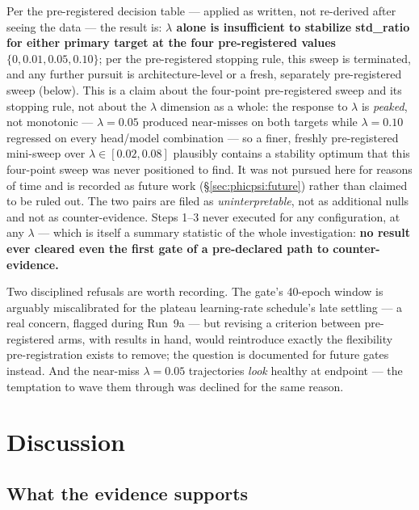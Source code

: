 \documentclass[11pt]{article}
\begin{document}
Per the pre-registered decision table --- applied as written, not re-derived after seeing the data --- the result is: \textbf{$\lambda$ alone is insufficient to stabilize std\_ratio for either primary target at the four pre-registered values $\{0, 0.01, 0.05, 0.10\}$}; per the pre-registered stopping rule, this sweep is terminated, and any further pursuit is architecture-level or a fresh, separately pre-registered sweep (below).
This is a claim about the four-point pre-registered sweep and its stopping rule, not about the $\lambda$ dimension as a whole: the response to $\lambda$ is \emph{peaked}, not monotonic --- $\lambda = 0.05$ produced near-misses on both targets while $\lambda = 0.10$ regressed on every head/model combination --- so a finer, freshly pre-registered mini-sweep over $\lambda \in [0.02, 0.08]$ plausibly contains a stability optimum that this four-point sweep was never positioned to find.
It was not pursued here for reasons of time and is recorded as future work (\S\ref{sec:phicpsi:future}) rather than claimed to be ruled out.
The two pairs are filed as \emph{uninterpretable}, not as additional nulls and not as counter-evidence.
Steps 1--3 never executed for any configuration, at any $\lambda$ --- which is itself a summary statistic of the whole investigation: \textbf{no result ever cleared even the first gate of a pre-declared path to counter-evidence.}

Two disciplined refusals are worth recording.
The gate's 40-epoch window is arguably miscalibrated for the plateau learning-rate schedule's late settling --- a real concern, flagged during Run~9a --- but revising a criterion between pre-registered arms, with results in hand, would reintroduce exactly the flexibility pre-registration exists to remove; the question is documented for future gates instead.
And the near-miss $\lambda = 0.05$ trajectories \emph{look} healthy at endpoint --- the temptation to wave them through was declined for the same reason.


\section{Discussion}
\label{sec:phicpsi:discussion}

\subsection{What the evidence supports}\label{subsec:what-the-evidence-supports}
\end{document}
